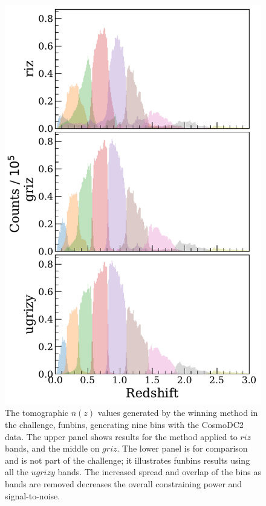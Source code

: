 \documentclass[twocolumn,twocolappendix]{aastex63}
\begin{document}
\begin{figure}[htbp]
	\includegraphics[width=1\linewidth]{results/nzbinned_dc2_funbins.pdf}
	\caption{The tomographic $n(z)$ values generated by the winning method in the challenge, {\sc funbins},
		generating nine bins with the CosmoDC2 data.
		The upper panel shows results for the method applied to $riz$ bands, and the middle on $griz$.
		The lower panel is for comparison and is not part of the challenge;
		it illustrates {\sc funbins} results using all the $ugrizy$ bands.
		The increased spread and overlap of the bins as bands are removed decreases the overall constraining
		power and signal-to-noise.
	}
	\label{fig:funbin_nz}
\end{figure}
\end{document}
